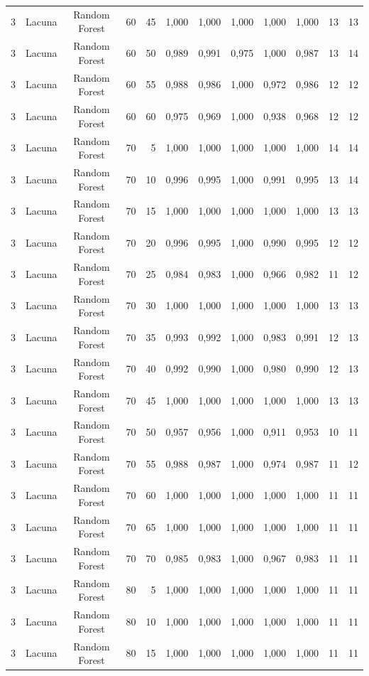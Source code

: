 \begin{longtable}{ccclrrrrrrrr}
3 & Lacuna & Random Forest & 60 & 45 & 1,000 & 1,000 & 1,000 & 1,000 & 1,000 & 13 & 13 \\
3 & Lacuna & Random Forest & 60 & 50 & 0,989 & 0,991 & 0,975 & 1,000 & 0,987 & 13 & 14 \\
3 & Lacuna & Random Forest & 60 & 55 & 0,988 & 0,986 & 1,000 & 0,972 & 0,986 & 12 & 12 \\
3 & Lacuna & Random Forest & 60 & 60 & 0,975 & 0,969 & 1,000 & 0,938 & 0,968 & 12 & 12 \\
3 & Lacuna & Random Forest & 70 & 5 & 1,000 & 1,000 & 1,000 & 1,000 & 1,000 & 14 & 14 \\
3 & Lacuna & Random Forest & 70 & 10 & 0,996 & 0,995 & 1,000 & 0,991 & 0,995 & 13 & 14 \\
3 & Lacuna & Random Forest & 70 & 15 & 1,000 & 1,000 & 1,000 & 1,000 & 1,000 & 13 & 13 \\
3 & Lacuna & Random Forest & 70 & 20 & 0,996 & 0,995 & 1,000 & 0,990 & 0,995 & 12 & 12 \\
3 & Lacuna & Random Forest & 70 & 25 & 0,984 & 0,983 & 1,000 & 0,966 & 0,982 & 11 & 12 \\
3 & Lacuna & Random Forest & 70 & 30 & 1,000 & 1,000 & 1,000 & 1,000 & 1,000 & 13 & 13 \\
3 & Lacuna & Random Forest & 70 & 35 & 0,993 & 0,992 & 1,000 & 0,983 & 0,991 & 12 & 13 \\
3 & Lacuna & Random Forest & 70 & 40 & 0,992 & 0,990 & 1,000 & 0,980 & 0,990 & 12 & 13 \\
3 & Lacuna & Random Forest & 70 & 45 & 1,000 & 1,000 & 1,000 & 1,000 & 1,000 & 13 & 13 \\
3 & Lacuna & Random Forest & 70 & 50 & 0,957 & 0,956 & 1,000 & 0,911 & 0,953 & 10 & 11 \\
3 & Lacuna & Random Forest & 70 & 55 & 0,988 & 0,987 & 1,000 & 0,974 & 0,987 & 11 & 12 \\
3 & Lacuna & Random Forest & 70 & 60 & 1,000 & 1,000 & 1,000 & 1,000 & 1,000 & 11 & 11 \\
3 & Lacuna & Random Forest & 70 & 65 & 1,000 & 1,000 & 1,000 & 1,000 & 1,000 & 11 & 11 \\
3 & Lacuna & Random Forest & 70 & 70 & 0,985 & 0,983 & 1,000 & 0,967 & 0,983 & 11 & 11 \\
3 & Lacuna & Random Forest & 80 & 5 & 1,000 & 1,000 & 1,000 & 1,000 & 1,000 & 11 & 11 \\
3 & Lacuna & Random Forest & 80 & 10 & 1,000 & 1,000 & 1,000 & 1,000 & 1,000 & 11 & 11 \\
3 & Lacuna & Random Forest & 80 & 15 & 1,000 & 1,000 & 1,000 & 1,000 & 1,000 & 11 & 11 \\

\end{longtable}

